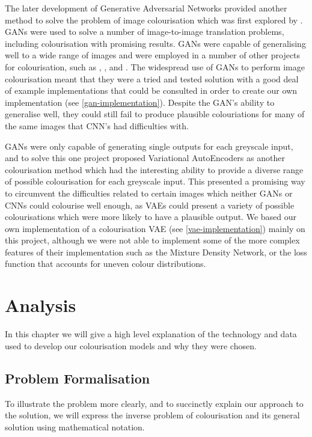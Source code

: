 \documentclass{l4proj}
\begin{document}
The later development of Generative Adversarial Networks provided another method to solve the problem of image colourisation which was first explored by \cite{ImageToImage}. GANs were used to solve a number of image-to-image translation problems, including colourisation with promising results. GANs were capable of generalising well to a wide range of images and were employed in a number of other projects for colourisation, such as \cite{MetalGAN}, \cite{DCGAN}, and \cite{GANColorization}. The widespread use of GANs to perform image colourisation meant that they were a tried and tested solution with a good deal of example implementations that could be consulted in order to create our own implementation (see \ref{gan-implementation}). Despite the GAN's ability to generalise well, they could still fail to produce plausible colouriations for many of the same images that CNN's had difficulties with.  

GANs were only capable of generating single outputs for each greyscale input, and to solve this one project \cite{DiverseColorization} proposed Variational AutoEncoders as another colourisation method which had the interesting ability to provide a diverse range of possible colourisation for each greyscale input. This presented a promising way to circumvent the difficulties related to certain images which neither GANs or CNNs could colourise well enough, as VAEs could present a variety of possible colourisations which were more likely to have a plausible output. We based our own implementation of a colourisation VAE (see \ref{vae-implementation}) mainly on this project, although we were not able to implement some of the more complex features of their implementation such as the Mixture Density Network, or the loss function that accounts for uneven colour distributions.

\chapter{Analysis}
In this chapter we will give a high level explanation of the technology and data used to develop our colourisation models and why they were chosen. 

\section{Problem Formalisation}
To illustrate the problem more clearly, and to succinctly explain our approach to the solution, we will express the inverse problem of colourisation and its general solution using mathematical notation.
\end{document}

